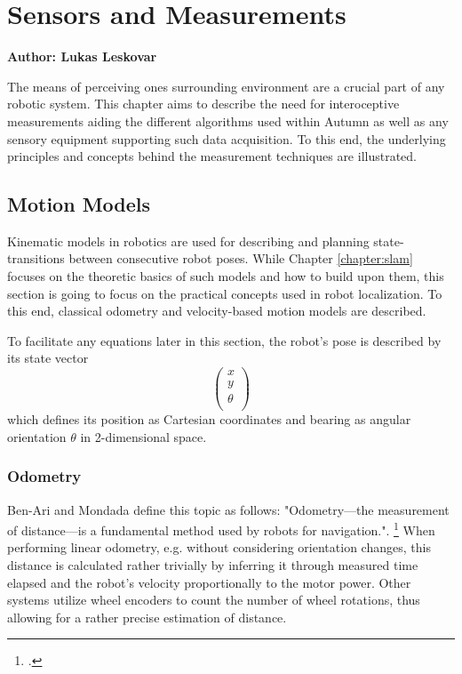 \chapter{Sensors and Measurements}\label{chapter:sensors}

\textbf{Author: Lukas Leskovar} 

The means of perceiving ones surrounding environment are a crucial part of any robotic system. This chapter aims to describe the need for interoceptive measurements aiding the different algorithms used within Autumn as well as any sensory equipment supporting such data acquisition. To this end, the underlying principles and concepts behind the measurement techniques are illustrated.

\section{Motion Models}
Kinematic models in robotics are used for describing and planning state-transitions between consecutive robot poses. While Chapter \ref{chapter:slam} focuses on the theoretic basics of such models and how to build upon them, this section is going to focus on the practical concepts used in robot localization. To this end, classical odometry and velocity-based motion models are described.

To facilitate any equations later in this section, the robot's pose is described by its state vector 
\[
\begin{pmatrix}
	x \\
	y \\
	\theta \\
\end{pmatrix}
\] 
which defines its position as Cartesian coordinates and bearing as angular orientation $\theta$ in 2-dimensional space. 

\subsection{Odometry}
Ben-Ari and Mondada define this topic as follows: "Odometry—the measurement of distance—is a fundamental method used by robots for navigation.". \footcite[Page 69]{ben2017elements} 
When performing linear odometry, e.g. without considering orientation changes, this distance is calculated rather trivially by inferring it through measured time elapsed and the robot's velocity proportionally to the motor power. 
Other systems utilize wheel encoders to count the number of wheel rotations, thus allowing for a rather precise estimation of distance. 

